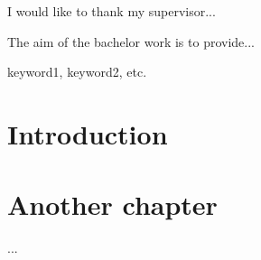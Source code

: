 \documentclass[11pt,oneside,draft]{fithesis2}
\begin{document}
\FrontMatter
\ThesisTitlePage

\begin{ThesisDeclaration}
\DeclarationText
\AdvisorName
\end{ThesisDeclaration}

\begin{ThesisThanks}
I would like to thank my supervisor...
\end{ThesisThanks}

\begin{ThesisAbstract}
The aim of the bachelor work is to provide...
\end{ThesisAbstract}

\begin{ThesisKeyWords}
keyword1, keyword2, etc.
\end{ThesisKeyWords}

\tableofcontents          %

\MainMatter

\chapter{Introduction}    %

\chapter{Another chapter}
...

\end{document}

